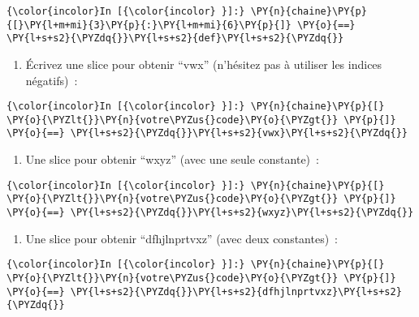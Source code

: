     \begin{Verbatim}[commandchars=\\\{\}]
{\color{incolor}In [{\color{incolor} }]:} \PY{n}{chaine}\PY{p}{[}\PY{l+m+mi}{3}\PY{p}{:}\PY{l+m+mi}{6}\PY{p}{]} \PY{o}{==} \PY{l+s+s2}{\PYZdq{}}\PY{l+s+s2}{def}\PY{l+s+s2}{\PYZdq{}}
\end{Verbatim}


    \begin{enumerate}
\def\labelenumi{\arabic{enumi})}
\tightlist
\item
  Écrivez une slice pour obtenir ``vwx'' (n'hésitez pas à utiliser les
  indices négatifs)~:
\end{enumerate}

    \begin{Verbatim}[commandchars=\\\{\}]
{\color{incolor}In [{\color{incolor} }]:} \PY{n}{chaine}\PY{p}{[} \PY{o}{\PYZlt{}}\PY{n}{votre\PYZus{}code}\PY{o}{\PYZgt{}} \PY{p}{]} \PY{o}{==} \PY{l+s+s2}{\PYZdq{}}\PY{l+s+s2}{vwx}\PY{l+s+s2}{\PYZdq{}}
\end{Verbatim}


    \begin{enumerate}
\def\labelenumi{\arabic{enumi})}
\setcounter{enumi}{1}
\tightlist
\item
  Une slice pour obtenir ``wxyz'' (avec une seule constante)~:
\end{enumerate}

    \begin{Verbatim}[commandchars=\\\{\}]
{\color{incolor}In [{\color{incolor} }]:} \PY{n}{chaine}\PY{p}{[} \PY{o}{\PYZlt{}}\PY{n}{votre\PYZus{}code}\PY{o}{\PYZgt{}} \PY{p}{]} \PY{o}{==} \PY{l+s+s2}{\PYZdq{}}\PY{l+s+s2}{wxyz}\PY{l+s+s2}{\PYZdq{}}
\end{Verbatim}


    \begin{enumerate}
\def\labelenumi{\arabic{enumi})}
\setcounter{enumi}{2}
\tightlist
\item
  Une slice pour obtenir ``dfhjlnprtvxz'' (avec deux constantes)~:
\end{enumerate}

    \begin{Verbatim}[commandchars=\\\{\}]
{\color{incolor}In [{\color{incolor} }]:} \PY{n}{chaine}\PY{p}{[} \PY{o}{\PYZlt{}}\PY{n}{votre\PYZus{}code}\PY{o}{\PYZgt{}} \PY{p}{]} \PY{o}{==} \PY{l+s+s2}{\PYZdq{}}\PY{l+s+s2}{dfhjlnprtvxz}\PY{l+s+s2}{\PYZdq{}}
\end{Verbatim}


